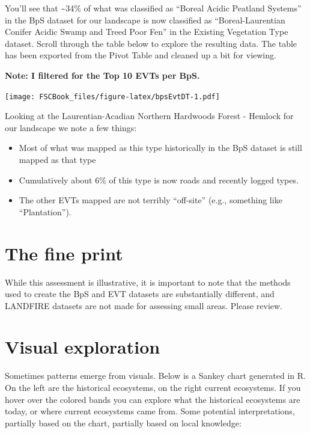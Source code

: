 \documentclass[
]{book}
\providecommand{\tightlist}{%
  \setlength{\itemsep}{0pt}\setlength{\parskip}{0pt}}
\begin{document}
You'll see that \textasciitilde34\% of what was classified as ``Boreal Acidic Peatland Systems'' in the BpS dataset for our landscape is now classified as ``Boreal-Laurentian Conifer Acidic Swamp and Treed Poor Fen'' in the Existing Vegetation Type dataset. Scroll through the table below to explore the resulting data. The table has been exported from the Pivot Table and cleaned up a bit for viewing.

\textbf{Note: I filtered for the Top 10 EVTs per BpS.}

\texttt{[image: FSCBook\_files/figure-latex/bpsEvtDT-1.pdf]}

Looking at the Laurentian-Acadian Northern Hardwoods Forest - Hemlock for our landscape we note a few things:

\begin{itemize}
\tightlist
\item
  Most of what was mapped as this type historically in the BpS dataset is still mapped as that type
\item
  Cumulatively about 6\% of this type is now roads and recently logged types.
\item
  The other EVTs mapped are not terribly ``off-site'' (e.g., something like ``Plantation'').
\end{itemize}

\hypertarget{the-fine-print}{%
\section{The fine print}\label{the-fine-print}}

While this assessment is illustrative, it is important to note that the methods used to create the BpS and EVT datasets are substantially different, and LANDFIRE datasets are not made for assessing small areas. Please review.

\hypertarget{visual-exploration}{%
\section{Visual exploration}\label{visual-exploration}}

Sometimes patterns emerge from visuals. Below is a Sankey chart generated in R. On the left are the historical ecosystems, on the right current ecosystems. If you hover over the colored bands you can explore what the historical ecosystems are today, or where current ecosystems came from. Some potential interpretations, partially based on the chart, partially based on local knowledge:
\end{document}
